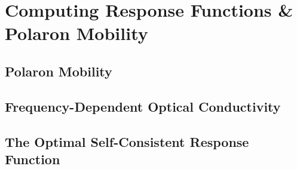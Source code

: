 \chapter{Computing Response Functions \& Polaron Mobility}
\label{chap:fifth}



\section{Polaron Mobility}
\label{sec:chap-fifth-first}

\section{Frequency-Dependent Optical Conductivity}
\label{sec:chap-fifth-second}

\section{The Optimal Self-Consistent Response Function}
\label{sec:chap-fifth-third}